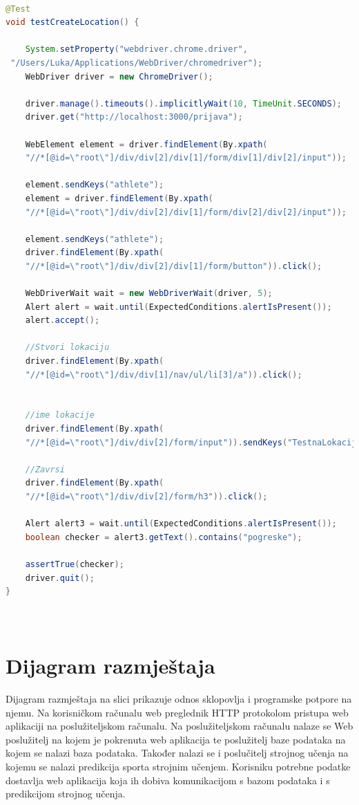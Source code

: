 		\begin{lstlisting}[language=Java,caption={testCreateLocation},label=DescriptiveLabel]
		
@Test
void testCreateLocation() {
		
	System.setProperty("webdriver.chrome.driver",
 "/Users/Luka/Applications/WebDriver/chromedriver");
	WebDriver driver = new ChromeDriver();

	driver.manage().timeouts().implicitlyWait(10, TimeUnit.SECONDS);
	driver.get("http://localhost:3000/prijava");
	
	WebElement element = driver.findElement(By.xpath(
	"//*[@id=\"root\"]/div/div[2]/div[1]/form/div[1]/div[2]/input")); 
     
	element.sendKeys("athlete");
	element = driver.findElement(By.xpath(
	"//*[@id=\"root\"]/div/div[2]/div[1]/form/div[2]/div[2]/input"));
	
	element.sendKeys("athlete");
	driver.findElement(By.xpath(
	"//*[@id=\"root\"]/div/div[2]/div[1]/form/button")).click();

	WebDriverWait wait = new WebDriverWait(driver, 5);
	Alert alert = wait.until(ExpectedConditions.alertIsPresent());
	alert.accept();
	
	//Stvori lokaciju
	driver.findElement(By.xpath(
	"//*[@id=\"root\"]/div/div[1]/nav/ul/li[3]/a")).click();
	
	
	//ime lokacije
	driver.findElement(By.xpath(
	"//*[@id=\"root\"]/div/div[2]/form/input")).sendKeys("TestnaLokacija");
	
	//Zavrsi
	driver.findElement(By.xpath(
	"//*[@id=\"root\"]/div/div[2]/form/h3")).click();
	
	Alert alert3 = wait.until(ExpectedConditions.alertIsPresent());
	boolean checker = alert3.getText().contains("pogreske");

	assertTrue(checker);
	driver.quit();
}

		
		\end{lstlisting}
		
		\eject
		
		
		\section{Dijagram razmještaja}
			Dijagram razmještaja na slici prikazuje odnos sklopovlja i programske potpore na njemu. Na korisničkom računalu web preglednik HTTP protokolom pristupa web aplikaciji na poslužiteljskom računalu. Na poslužiteljskom računalu nalaze se Web poslužitelj na kojem je pokrenuta web aplikacija te poslužitelj baze podataka na kojem se nalazi baza podataka. Također nalazi se i poslučitelj strojnog učenja na kojemu se nalazi predikcija sporta strojnim učenjem. Korisniku potrebne podatke dostavlja web aplikacija koja ih dobiva komunikacijom s bazom podataka i s predikcijom strojnog učenja.
			
